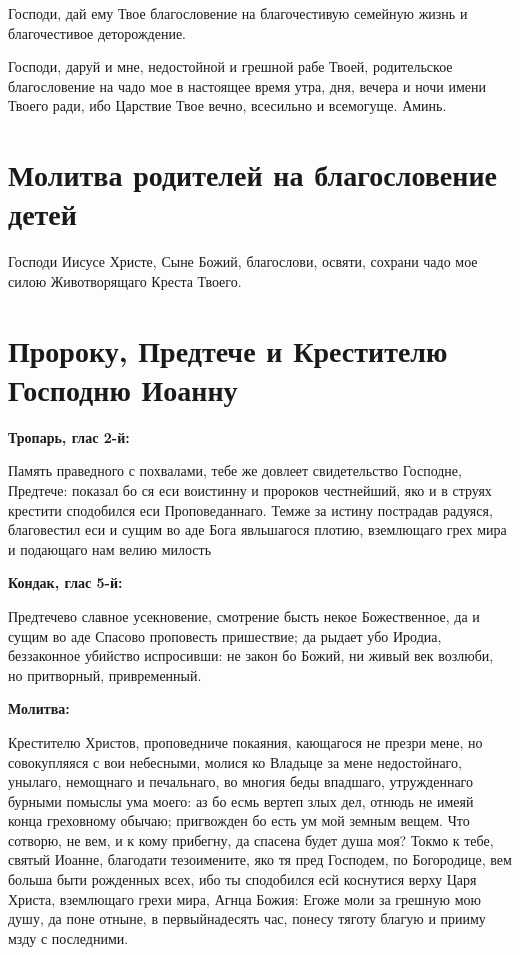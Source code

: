 Господи, дай ему Твое благословение на благочестивую семейную жизнь и благочестивое деторождение.

Господи, даруй и мне, недостойной и грешной рабе Твоей, родительское благословение на чадо мое в настоящее время утра, дня, вечера и ночи имени Твоего ради, ибо Царствие Твое вечно, всесильно и всемогуще. Аминь.


\section{Молитва родителей на благословение детей}
 


Господи Иисусе Христе, Сыне Божий, благослови, освяти, сохрани чадо мое силою Животворящаго Креста Твоего.


\section{Пророку, Предтече и Крестителю Господню Иоанну}
 
\bfseries Тропарь, глас 2-й:\normalfont{}


Память праведного с похвалами, тебе же довлеет свидетельство Господне, Предтече: показал бо ся еси воистинну и пророков честнейший, яко и в струях крестити сподобился еси Проповеданнаго. Темже за истину пострадав радуяся, благовестил еси и сущим во аде Бога явльшагося плотию, вземлющаго грех мира и подающаго нам велию милость


\medskip
\bfseries Кондак, глас 5-й:\normalfont{}


Предтечево славное усекновение, смотрение бысть некое Божественное, да и сущим во аде Спасово проповесть пришествие; да рыдает убо Иродиа, беззаконное убийство испросивши: не закон бо Божий, ни живый век возлюби, но притворный, привременный.


\medskip
\bfseries Молитва:\normalfont{}


Крестителю Христов, проповедниче покаяния, кающагося не презри мене, но совокупляяся с вои небесными, молися ко Владыце за мене недостойнаго, унылаго, немощнаго и печальнаго, во многия беды впадшаго, утружденнаго бурными помыслы ума моего: аз бо есмь вертеп злых дел, отнюдь не имеяй конца греховному обычаю; пригвожден бо есть ум мой земным вещем. Что сотворю, не вем, и к кому прибегну, да спасена будет душа моя? Токмо к тебе, святый Иоанне, благодати тезоимените, яко тя пред Господем, по Богородице, вем больша быти рожденных всех, ибо ты сподобился есй коснутися верху Царя Христа, вземлющаго грехи мира, Агнца Божия: Егоже моли за грешную мою душу, да поне отныне, в первыйнадесять час, понесу тяготу благую и прииму мзду с последними. 


